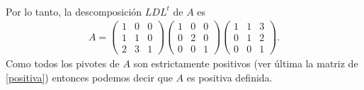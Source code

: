 \documentclass[11pt,letterpaper]{article}
\begin{document}
\begin{enumerate}
\begin{align*}
\end{align*}
Por lo tanto, la descomposición $LDL^t$ de $A$ es
\begin{align*}
A= \begin{pmatrix}
 1 & 0 & 0 \\
 1 & 1 & 0\\
 2 & 3 & 1
\end{pmatrix}\begin{pmatrix}
 1 & 0 & 0 \\
 0 & 2 & 0\\
 0 & 0 & 1
\end{pmatrix}\begin{pmatrix}
 1 & 1 & 3 \\
 0 & 1 & 2\\
 0 & 0 & 1
\end{pmatrix}.
\end{align*}
Como todos los pivotes de $A$ son estrictamente positivos (ver última la matriz de \ref{positiva}) entonces podemos decir que $A$ es positiva definida. \\


\end{enumerate}
\end{document}
